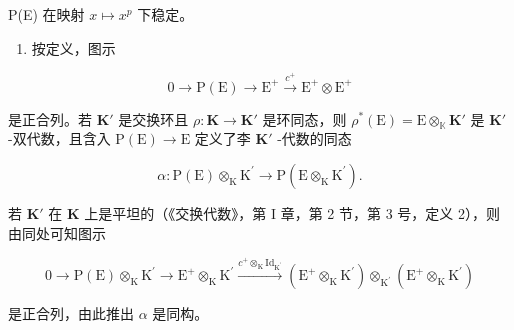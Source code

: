P(E) 在映射 \(x \mapsto x^p\) 下稳定。

\begin{enumerate}
\def\labelenumi{(\arabic{enumi})}
\setcounter{enumi}{1}
\tightlist
\item
  按定义，图示
\end{enumerate}

\[
0 \longrightarrow \mathrm{P(E)} \longrightarrow \mathrm {E^ {+}} \stackrel {c ^ {+}} {\longrightarrow} \mathrm {E^ {+}} \otimes \mathrm {E^ {+}}
\]

是正合列。若 \(\mathbf{K}'\) 是交换环且 \(\rho: \mathbf{K} \to \mathbf{K}'\) 是环同态，则 \(\rho^*(\mathrm{E}) = \mathrm{E} \otimes_{\mathbb{K}} \mathbf{K}'\) 是 \(\mathbf{K}'\) -双代数，且含入 \(\mathrm{P}(\mathrm{E}) \to \mathrm{E}\) 定义了李 \(\mathbf{K}'\) -代数的同态

\[
\alpha \colon \mathrm{P} (\mathrm{E}) \otimes_ {\mathrm{K}} \mathrm{K} ^ {\prime} \rightarrow \mathrm{P} (\mathrm{E} \otimes_ {\mathrm{K}} \mathrm{K} ^ {\prime}).
\]

若 \(\mathbf{K}'\) 在 \(\mathbf{K}\) 上是平坦的（《交换代数》，第 I 章，第 2 节，第 3 号，定义 2），则由同处可知图示

\[
0 \longrightarrow \mathrm{P} (\mathrm{E}) \otimes_ {\mathrm{K}} \mathrm{K} ^ {\prime} \longrightarrow \mathrm{E} ^ {+} \otimes_ {\mathrm{K}} \mathrm{K} ^ {\prime} \xrightarrow {c ^ {+} \otimes_ {\mathrm{K}} \mathrm{Id} _ {\mathrm{K} ^ {\prime}}} \left(\mathrm{E} ^ {+} \otimes_ {\mathrm{K}} \mathrm{K} ^ {\prime}\right) \otimes_ {\mathrm{K} ^ {\prime}} \left(\mathrm{E} ^ {+} \otimes_ {\mathrm{K}} \mathrm{K} ^ {\prime}\right)
\]

是正合列，由此推出 \(\alpha\) 是同构。

